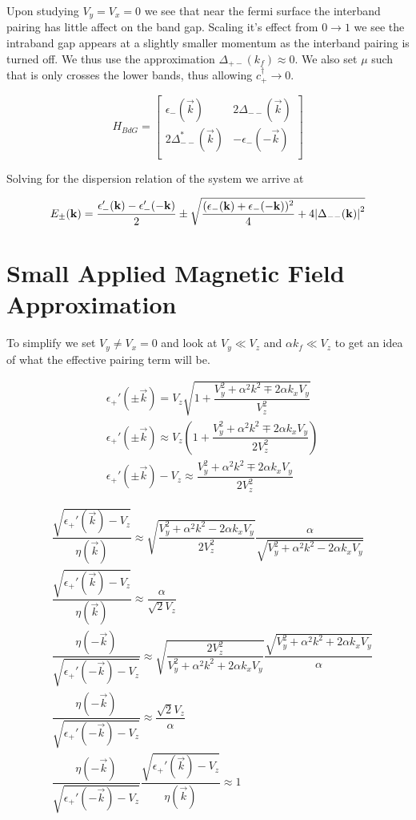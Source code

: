 Upon studying $V_y=V_x=0$ we see that near the fermi surface the interband pairing has little affect on the band gap. Scaling it's effect from $0 \to 1$ we see the intraband gap appears at a slightly smaller momentum as the interband pairing is turned off. We thus use the approximation $\Delta_{+-}(k_f) \approx 0$. We also set $\mu$ such that is only crosses the lower bands, thus allowing $c_+^{\dagger} \to 0$.

\begin{equation}
  H_{BdG} =
  \begin{bmatrix}
    \epsilon_-(\vec{k}) & 2\Delta_{--}(\vec{k}) \\
    2\Delta_{--}^*(\vec{k}) & -\epsilon_-(-\vec{k}) \\
  \end{bmatrix}
\end{equation}

Solving for the dispersion relation of the system we arrive at

\begin{align}
  E_{\pm}(\mathbf{k}) = \dfrac{\epsilon_-'(\mathbf{k})-\epsilon_-'(-\mathbf{k})}{2} \pm \sqrt{\dfrac{(\epsilon_-(\mathbf{k})+\epsilon_-(-\mathbf{k}))^2}{4}+4\abs{\Delta_{--}(\mathbf{k})}^2}
\end{align}

\section{Small Applied Magnetic Field Approximation}

To simplify we set $V_y\neq V_x =0$ and look at $V_y\ll V_z$ and $\alpha k_f \ll V_z$ to get an idea of what the effective pairing term will be.

\begin{align}
  &\epsilon_+'(\pm\vec{k}) = V_z\sqrt{1+\dfrac{V_y^2+\alpha^2k^2\mp2\alpha k_xV_y}{V_z^2}} \\
  &\epsilon_+'(\pm\vec{k}) \approx V_z\left(1+\dfrac{V_y^2+\alpha^2k^2\mp2\alpha k_xV_y}{2V_z^2}\right) \\
  &\epsilon_+'(\pm\vec{k}) -V_z \approx \dfrac{V_y^2+\alpha^2k^2\mp2\alpha k_xV_y}{2V_z^2}
\end{align}

\begin{align}
  &\dfrac{\sqrt{\epsilon_+'(\vec{k}) -V_z}}{\eta(\vec{k})} \approx \sqrt{\dfrac{V_y^2+\alpha^2k^2-2\alpha k_xV_y}{2V_z^2}} \dfrac{\alpha}{\sqrt{V_y^2+\alpha^2k^2-2\alpha k_xV_y}} \\
  &\dfrac{\sqrt{\epsilon_+'(\vec{k}) -V_z}}{\eta(\vec{k})} \approx \dfrac{\alpha}{\sqrt{2}V_z} \\
  &\dfrac{\eta(-\vec{k})}{\sqrt{\epsilon_+'(-\vec{k}) -V_z}} \approx \sqrt{\dfrac{2V_z^2}{V_y^2+\alpha^2k^2+2\alpha k_xV_y}} \dfrac{\sqrt{V_y^2+\alpha^2k^2+2\alpha k_xV_y}}{\alpha} \\
  &\dfrac{\eta(-\vec{k})}{\sqrt{\epsilon_+'(-\vec{k}) -V_z}} \approx \dfrac{\sqrt{2}V_z}{\alpha} \\
  &\dfrac{\eta(-\vec{k})}{\sqrt{\epsilon_+'(-\vec{k}) -V_z}} \dfrac{\sqrt{\epsilon_+'(\vec{k}) -V_z}}{\eta(\vec{k})} \approx 1
\end{align}

